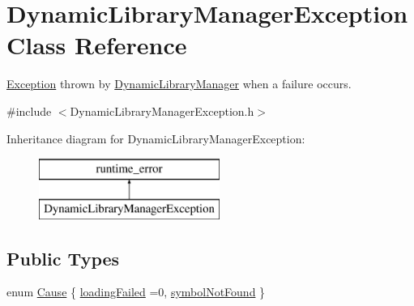 \hypertarget{class_dynamic_library_manager_exception}{\section{Dynamic\-Library\-Manager\-Exception Class Reference}
\label{class_dynamic_library_manager_exception}
}


\hyperlink{class_exception}{Exception} thrown by \hyperlink{class_dynamic_library_manager}{Dynamic\-Library\-Manager} when a failure occurs.  




{\ttfamily \#include $<$Dynamic\-Library\-Manager\-Exception.\-h$>$}

Inheritance diagram for Dynamic\-Library\-Manager\-Exception\-:\begin{figure}[H]
\begin{center}
\leavevmode
\includegraphics[height=2.000000cm]{class_dynamic_library_manager_exception}
\end{center}
\end{figure}
\subsection*{Public Types}
\begin{DoxyCompactItemize}
\item 
enum \hyperlink{class_dynamic_library_manager_exception_a73b4694c152e0693fbc19fb04987a0b9}{Cause} \{ \hyperlink{class_dynamic_library_manager_exception_a73b4694c152e0693fbc19fb04987a0b9a778b42fb996bf018bdc26934649cad63}{loading\-Failed} =0, 
\hyperlink{class_dynamic_library_manager_exception_a73b4694c152e0693fbc19fb04987a0b9a193fc58bb852e09790da269e2b613045}{symbol\-Not\-Found}
 \}
\end{DoxyCompactItemize}
